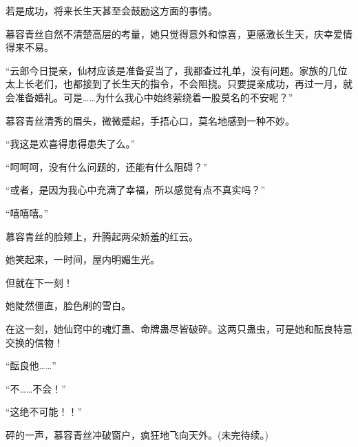 \begin{this_body}
若是成功，将来长生天甚至会鼓励这方面的事情。

慕容青丝自然不清楚高层的考量，她只觉得意外和惊喜，更感激长生天，庆幸爱情得来不易。

“云郎今日提亲，仙材应该是准备妥当了，我都查过礼单，没有问题。家族的几位太上长老们，也都接到了长生天的指令，不会阻挠。只要提亲成功，再过一月，就会准备婚礼。可是……为什么我心中始终萦绕着一股莫名的不安呢？”

慕容青丝清秀的眉头，微微蹙起，手捂心口，莫名地感到一种不妙。

“我这是欢喜得患得患失了么。”

“呵呵呵，没有什么问题的，还能有什么阻碍？”

“或者，是因为我心中充满了幸福，所以感觉有点不真实吗？”

“嘻嘻嘻。”

慕容青丝的脸颊上，升腾起两朵娇羞的红云。

她笑起来，一时间，屋内明媚生光。

但就在下一刻！

她陡然僵直，脸色刷的雪白。

在这一刻，她仙窍中的魂灯蛊、命牌蛊尽皆破碎。这两只蛊虫，可是她和酝良特意交换的信物！

“酝良他……”

“不……不会！”

“这绝不可能！！”

砰的一声，慕容青丝冲破窗户，疯狂地飞向天外。(未完待续。)

\end{this_body}

